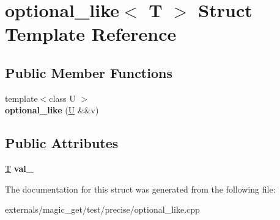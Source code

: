 \hypertarget{structoptional__like}{}\section{optional\+\_\+like$<$ T $>$ Struct Template Reference}
\label{structoptional__like}
\subsection*{Public Member Functions}
\begin{DoxyCompactItemize}
\item 
\mbox{\label{structoptional__like_ab592ca708c631fdc53ccc3c80c8f9807}} 
{\footnotesize template$<$class U $>$ }\\{\bfseries optional\+\_\+like} (\mbox{\hyperlink{union_u}{U}} \&\&v)
\end{DoxyCompactItemize}
\subsection*{Public Attributes}
\begin{DoxyCompactItemize}
\item 
\mbox{\label{structoptional__like_af5bb1182397b456ac9c8e45c916f525f}} 
\mbox{\hyperlink{struct_t}{T}} {\bfseries val\+\_\+}
\end{DoxyCompactItemize}


The documentation for this struct was generated from the following file\+:\begin{DoxyCompactItemize}
\item 
externals/magic\+\_\+get/test/precise/optional\+\_\+like.\+cpp\end{DoxyCompactItemize}
